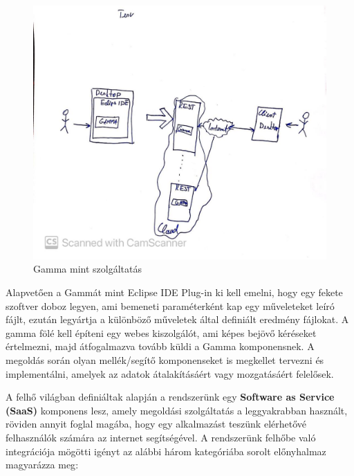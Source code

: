 \begin{figure}[t]
	\centering
	\includegraphics[width=150mm, keepaspectratio]{figures/transformation.jpg}
	\caption{Gamma mint szolgáltatás}
	\label{fig:transformation}
\end{figure}


Alapvetően a Gammát mint Eclipse IDE Plug-in ki kell emelni, hogy egy fekete szoftver doboz legyen, ami bemeneti paraméterként kap egy műveleteket leíró fájlt, ezután legyártja a különböző műveletek által definiált eredmény fájlokat. A gamma fölé kell építeni egy webes kiszolgálót, ami képes bejövő kéréseket értelmezni, majd átfogalmazva tovább küldi a Gamma komponensnek. A megoldás során olyan mellék/segítő komponenseket is megkellet tervezni és implementálni, amelyek az adatok átalakításáért vagy mozgatásáért felelősek.


A felhő világban definiáltak alapján a rendszerünk egy \textbf{Software as Service (SaaS)} komponens lesz, amely megoldási szolgáltatás a leggyakrabban használt, röviden annyit foglal magába, hogy egy alkalmazást teszünk elérhetővé felhasználók számára az internet segítségével.
A rendszerünk felhőbe való integrációja mögötti igényt az alábbi három kategóriába sorolt előnyhalmaz magyarázza meg\cite{top10}\cite{ibm}:

